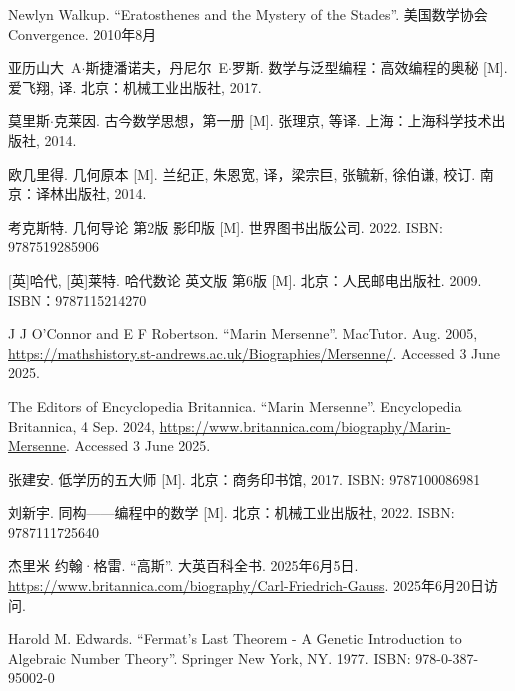 Newlyn Walkup. ``Eratosthenes and the Mystery of the Stades''. 美国数学协会 Convergence. 2010年8月


亚历山大\ A$\cdot$斯捷潘诺夫，丹尼尔\ E$\cdot$罗斯. 数学与泛型编程：高效编程的奥秘 [M]. 爱飞翔, 译. 北京：机械工业出版社, 2017. %

莫里斯$\cdot$克莱因. 古今数学思想，第一册 [M]. 张理京, 等译. 上海：上海科学技术出版社, 2014. %

欧几里得. 几何原本 [M]. 兰纪正, 朱恩宽, 译，梁宗巨, 张毓新, 徐伯谦, 校订. 南京：译林出版社, 2014. %

考克斯特. 几何导论 第2版 影印版 [M]. 世界图书出版公司. 2022. ISBN: 9787519285906

[英]哈代, [英]莱特. 哈代数论 英文版 第6版 [M]. 北京：人民邮电出版社. 2009. ISBN：9787115214270

J J O'Connor and E F Robertson. ``Marin Mersenne''. MacTutor. Aug. 2005, \url{https://mathshistory.st-andrews.ac.uk/Biographies/Mersenne/}. Accessed 3 June 2025.

The Editors of Encyclopedia Britannica. ``Marin Mersenne''. Encyclopedia Britannica, 4 Sep. 2024, \url{https://www.britannica.com/biography/Marin-Mersenne}. Accessed 3 June 2025.

张建安. 低学历的五大师 [M]. 北京：商务印书馆, 2017. ISBN: 9787100086981

刘新宇. 同构——编程中的数学 [M]. 北京：机械工业出版社, 2022. ISBN: 9787111725640

杰里米 约翰·格雷. ``高斯''. 大英百科全书. 2025年6月5日. \url{https://www.britannica.com/biography/Carl-Friedrich-Gauss}. 2025年6月20日访问.

Harold M. Edwards. ``Fermat's Last Theorem - A Genetic Introduction to Algebraic Number Theory''. Springer New York, NY. 1977. ISBN: 978-0-387-95002-0

